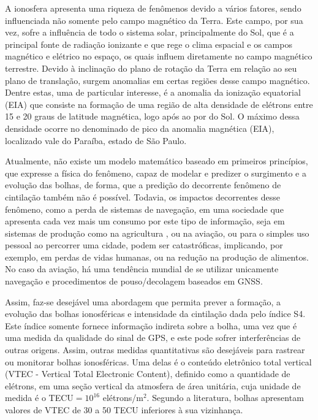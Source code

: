 A ionosfera apresenta uma riqueza de fenômenos devido a vários fatores, sendo influenciada não somente pelo campo magnético da Terra. Este campo, por sua vez, sofre a influência de todo o sistema solar, principalmente do Sol, que é a principal fonte de radiação ionizante e que rege o clima espacial e os campos magnético e elétrico no espaço, os quais influem diretamente no campo magnético terrestre. Devido à inclinação do plano de rotação da Terra em relação ao seu plano de translação, surgem anomalias em certas regiões desse campo magnético. Dentre estas, uma de particular interesse, é a anomalia da ionização equatorial (EIA) que consiste na formação de uma região de alta densidade de elétrons entre 15 e 20 graus de latitude magnética, logo após ao por do Sol. O máximo dessa densidade ocorre no denominado de pico da anomalia magnética (EIA), localizado vale do Paraíba, estado de São Paulo.

Atualmente, não existe um modelo matemático baseado em primeiros princípios, que expresse a física do fenômeno, capaz de modelar e predizer o surgimento e a evolução das bolhas, de forma, que a predição do decorrente fenômeno de cintilação também não é possível. Todavia, os impactos decorrentes desse fenômeno, como a perda de sistemas de navegação, em uma sociedade que apresenta cada vez mais um consumo por este tipo de informação, seja em sistemas de produção como na agricultura \cite{STAFFORD:2000}, ou na aviação, ou para o simples uso pessoal ao percorrer uma cidade, podem ser catastróficas, implicando, por exemplo, em perdas de vidas humanas, ou na redução na produção de alimentos. No caso da aviação, há uma tendência mundial de se utilizar unicamente navegação e procedimentos de pouso/decolagem baseados em GNSS.

Assim, faz-se desejável uma abordagem que permita prever a formação, a evolução das bolhas ionosféricas e intensidade da cintilação dada pelo índice S4. Este índice somente fornece informação indireta sobre a bolha, uma vez que é uma medida da qualidade do sinal de GPS, e este pode sofrer interferências de outras origens. Assim, outras medidas quantitativas são desejáveis para rastrear ou monitorar bolhas ionosféricas. Uma delas é o conteúdo eletrônico total vertical (VTEC - Vertical Total Electronic Content), definido como a quantidade de elétrons, em uma seção vertical da atmosfera de área unitária, cuja unidade de medida é o TECU$=10^{16}$ elétrons/m$^2$. Segundo a literatura, bolhas apresentam valores de VTEC de 30 a 50 TECU inferiores à sua vizinhança.

